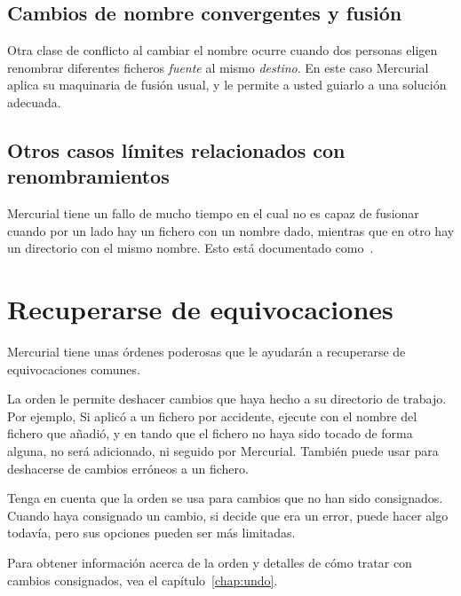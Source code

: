 \subsection{Cambios de nombre convergentes y fusión}

Otra clase de conflicto al cambiar el nombre ocurre cuando dos
personas eligen renombrar diferentes ficheros \emph{fuente} al mismo
\emph{destino}. En este caso Mercurial aplica su maquinaria de fusión
usual, y le permite a usted guiarlo a una solución adecuada.

\subsection{Otros casos límites relacionados con renombramientos}

Mercurial tiene un fallo de mucho tiempo en el cual no es capaz de
fusionar cuando por un lado hay un fichero con un nombre dado,
mientras que en otro hay un directorio con el mismo nombre. Esto está
documentado como~.

\section{Recuperarse de equivocaciones}

Mercurial tiene unas órdenes poderosas que le ayudarán a recuperarse
de equivocaciones comunes.

La orden  le permite deshacer cambios que haya hecho a
su directorio de trabajo. Por ejemplo, Si aplicó  a un
fichero por accidente, ejecute  con el nombre del
fichero que añadió, y en tando que el fichero no haya sido tocado de
forma alguna, no será adicionado, ni seguido por Mercurial.  También
puede usar  para deshacerse de cambios erróneos a un
fichero.

Tenga en cuenta que la orden  se usa para cambios que no
han sido consignados. Cuando haya consignado un cambio, si decide que
era un error, puede hacer algo todavía, pero sus opciones pueden ser
más limitadas.

Para obtener información acerca de la orden  y detalles
de cómo tratar con cambios consignados, vea el capítulo~\ref{chap:undo}.

